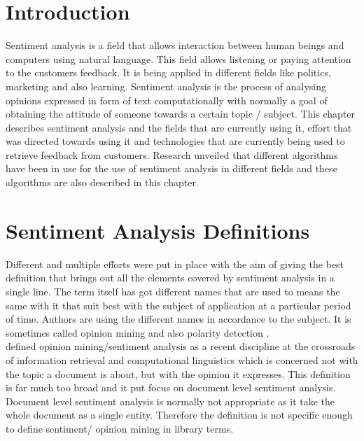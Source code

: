\documentclass[12pt]{report}
\begin{document}
	\section{Introduction}
	Sentiment analysis is a field that allows interaction between human beings and computers using natural language. This field allows listening or paying attention to the customers feedback. It is being applied in different fields like politics, marketing and also learning. Sentiment analysis is the process of analysing opinions expressed in form of text computationally with normally a goal of obtaining the attitude of someone towards a certain topic / subject. This chapter describes sentiment analysis and the fields that are currently using it, effort that was directed towards using it and technologies that are currently being used to retrieve feedback from customers. Research unveiled that different algorithms have been in use for the use of sentiment analysis in different fields and these algorithms are also described in this chapter.

\section{Sentiment Analysis Definitions}
Different and multiple efforts were put in place with the aim of giving the best definition that brings out all the elements covered by sentiment analysis in a single line. The term itself has got different names that are used to means the same with it that suit best with the subject of application at a particular period of time. Authors are using the different names in accordance to the subject. It is sometimes called opinion mining \citep{pang2008opinion} and also polarity detection \citep{sharma2014polarity}.   \\
 \cite{inproceedings} defined opinion mining/sentiment analysis as a recent discipline at the crossroads of information retrieval and computational linguistics which is concerned not with the topic a document is about, but with the opinion it expresses. This definition is far much too broad and it put focus on document level sentiment analysis. Document level sentiment analysis is normally not appropriate as it take the whole document as a single entity. Therefore the definition is not specific enough to define sentiment/ opinion mining in library terms. \\
 
\end{document}
